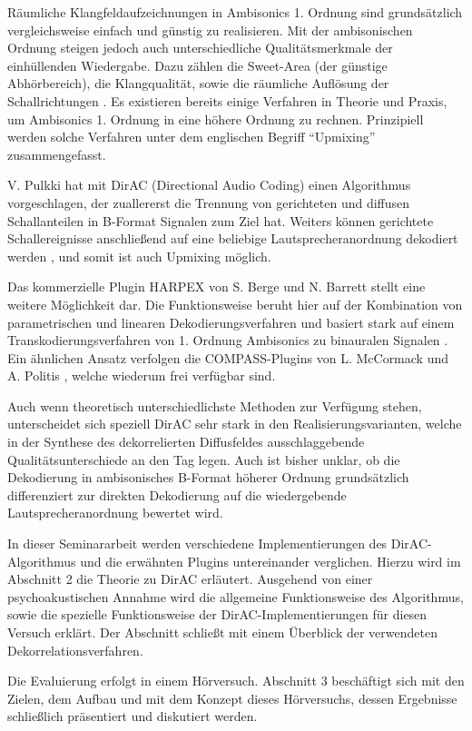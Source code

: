 Räumliche Klangfeldaufzeichnungen in Ambisonics 1. Ordnung sind grundsätzlich vergleichsweise einfach und günstig zu realisieren. Mit der ambisonischen Ordnung steigen jedoch auch unterschiedliche Qualitätsmerkmale der einhüllenden Wiedergabe. Dazu zählen die Sweet-Area (der günstige Abhörbereich), die Klangqualität, sowie die räumliche Auflösung der Schallrichtungen \cite{ambi-book}. Es existieren bereits einige Verfahren in Theorie und Praxis, um Ambisonics 1. Ordnung in eine höhere Ordnung zu rechnen. Prinzipiell werden solche Verfahren unter dem englischen Begriff ``Upmixing'' zusammengefasst.

V. Pulkki hat mit DirAC (Directional Audio Coding) \cite{pulkki} einen Algorithmus vorgeschlagen, der zuallererst die Trennung von gerichteten und diffusen Schallanteilen in B-Format Signalen zum Ziel hat. Weiters können gerichtete Schallereignisse anschließend auf eine beliebige Lautsprecheranordnung dekodiert werden \cite{spatial-book}, und somit ist auch Upmixing möglich.

Das kommerzielle Plugin HARPEX von S. Berge und N. Barrett stellt eine weitere Möglichkeit dar. Die Funktionsweise beruht hier auf der Kombination von parametrischen und linearen Dekodierungsverfahren \cite{harpy2} und basiert stark auf einem Transkodierungsverfahren von 1. Ordnung Ambisonics zu binauralen Signalen \cite{harpy}. Ein ähnlichen Ansatz verfolgen die COMPASS-Plugins von L. McCormack und A. Politis \cite{compy}, welche wiederum frei verfügbar sind.

Auch wenn theoretisch unterschiedlichste Methoden zur Verfügung stehen, unterscheidet sich speziell DirAC sehr stark in den Realisierungsvarianten, welche in der Synthese des dekorrelierten Diffusfeldes ausschlaggebende Qualitätsunterschiede an den Tag legen. Auch ist bisher unklar, ob die Dekodierung in ambisonisches B-Format höherer Ordnung grundsätzlich differenziert zur direkten Dekodierung auf die wiedergebende Lautsprecheranordnung bewertet wird.

In dieser Seminararbeit werden verschiedene Implementierungen des DirAC-Algorithmus und die erwähnten Plugins untereinander verglichen. Hierzu wird im Abschnitt 2 die Theorie zu DirAC erläutert. Ausgehend von einer psychoakustischen Annahme wird die allgemeine Funktionsweise des Algorithmus, sowie die spezielle Funktionsweise der DirAC-Implementierungen für diesen Versuch erklärt. Der Abschnitt schließt mit einem Überblick der verwendeten Dekorrelationsverfahren.

Die Evaluierung erfolgt in einem Hörversuch. Abschnitt 3 beschäftigt sich mit den Zielen, dem Aufbau und mit dem Konzept dieses Hörversuchs, dessen Ergebnisse schließlich präsentiert und diskutiert werden.